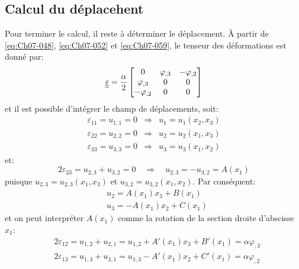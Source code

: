 \subsection{Calcul du déplacehent} \label{ssec:Ch07-2.3}
Pour terminer le calcul, il reste à déterminer le déplacement.
\`A partir de \eqref{eq:Ch07-048}, \eqref{eq:Ch07-052} et \eqref{eq:Ch07-059}, le tenseur des déformations est donné par:
\begin{equation}
    \underline{\underline{\varepsilon}} = 
    \frac{\alpha}{2} 
    \begin{bmatrix}
        0 & \varphi_{,3} & -\varphi_{,2} \\
        \varphi_{,3} & 0 & 0 \\
        -\varphi_{,2} & 0 & 0
    \end{bmatrix}
    \label{eq:Ch07-069}
\end{equation}
et il est possible d'intégrer le champ de déplacements, soit:
\begin{equation}
    \begin{aligned}
        \varepsilon_{11} = u_{1,1} = 0 & \Rightarrow & u_1 =u_1 \left( x_2,x_3 \right) \\
        \varepsilon_{22} = u_{2,2} = 0 & \Rightarrow & u_2 =u_2 \left( x_1,x_3 \right) \\
        \varepsilon_{33} = u_{3,3} = 0 & \Rightarrow & u_3 =u_3 \left( x_1,x_2 \right)
    \end{aligned}
    \label{eq:Ch07-070}
\end{equation}
et:
\begin{equation}
2\varepsilon_{23} = u_{2,3} + u_{3,2} =0 \quad \Rightarrow \quad u_{2,3} = - u_{3,2} = A(x_1)
\end{equation}
puisque $u_{2,3} = u_{2,3}(x_1,x_3)$ et $u_{3,2} = u_{3,2} (x_1,x_2)$. Par conséquent:
\begin{equation}
    \begin{aligned}
        & u_2 = A(x_1) x_3 + B(x_1)\\
        & u_3 = -A(x_1) x_2 + C(x_1)
    \end{aligned}
    \label{eq:Ch07-071} 
\end{equation}
et on peut interpréter $A(x_1)$ comme la rotation de la section droite d'abscisse $x_1$:
\begin{equation}
    \begin{aligned}
        &2\varepsilon_{12} = u_{1,2} + u_{2,1} = u_{1,2} + A'(x_1) x_3 + B'(x_1) = \alpha \varphi_{,3}\\
        &2\varepsilon_{13} = u_{1,3} + u_{3,1} = u_{1,3} - A'(x_1) x_2 + C'(x_1) = \alpha \varphi_{,2}
    \end{aligned}
    \label{eq:Ch07-072}
\end{equation}
